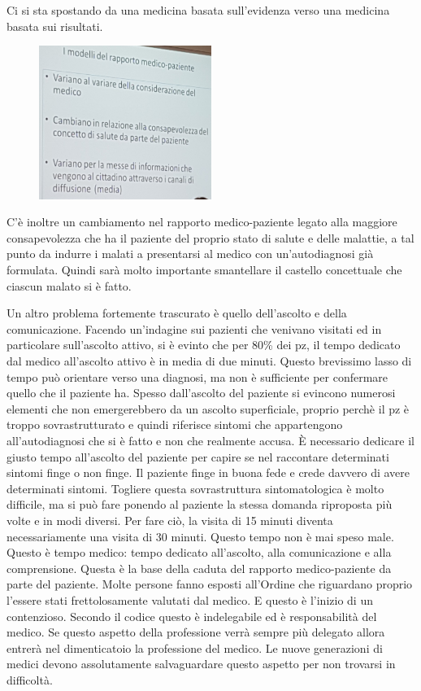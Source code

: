 Ci
si sta spostando da una medicina basata sull'evidenza verso una medicina
basata sui risultati.

\begin{figure}[!ht]
\centering
	\includegraphics[width=0.5\textwidth]{29/image4.jpeg}
	\end{figure}

C'è inoltre un cambiamento nel rapporto medico-paziente legato alla
maggiore consapevolezza che ha il paziente del proprio stato di salute e
delle malattie, a tal punto da indurre i malati a presentarsi al medico
con un'autodiagnosi già formulata. Quindi sarà molto importante
smantellare il castello concettuale che ciascun malato si è fatto.

Un altro problema fortemente trascurato è quello dell'ascolto e della
comunicazione. Facendo un'indagine sui pazienti che venivano visitati ed
in particolare sull'ascolto attivo, si è evinto che per 80\% dei pz, il
tempo dedicato dal medico all'ascolto attivo è in media di due minuti.
Questo brevissimo lasso di tempo può orientare verso una diagnosi, ma
non è sufficiente per confermare quello che il paziente ha. Spesso
dall'ascolto del paziente si evincono numerosi elementi che non
emergerebbero da un ascolto superficiale, proprio perchè il pz è troppo
sovrastrutturato e quindi riferisce sintomi che appartengono
all'autodiagnosi che si è fatto e non che realmente accusa. È necessario
dedicare il giusto tempo all'ascolto del paziente per capire se nel
raccontare determinati sintomi finge o non finge. Il paziente finge in
buona fede e crede davvero di avere determinati sintomi. Togliere questa
sovrastruttura sintomatologica è molto difficile, ma si può fare ponendo
al paziente la stessa domanda riproposta più volte e in modi diversi.
Per fare ciò, la visita di 15 minuti diventa necessariamente una visita
di 30 minuti. Questo tempo non è mai speso male. Questo è tempo medico:
tempo dedicato all'ascolto, alla comunicazione e alla comprensione.
Questa è la base della caduta del rapporto medico-paziente da parte del
paziente. Molte persone fanno esposti all'Ordine che riguardano proprio
l'essere stati frettolosamente valutati dal medico. E questo è l'inizio
di un contenzioso. Secondo il codice questo è indelegabile ed è
responsabilità del medico. Se questo aspetto della professione verrà
sempre più delegato allora entrerà nel dimenticatoio la professione del
medico. Le nuove generazioni di medici devono assolutamente
salvaguardare questo aspetto per non trovarsi in difficoltà.

